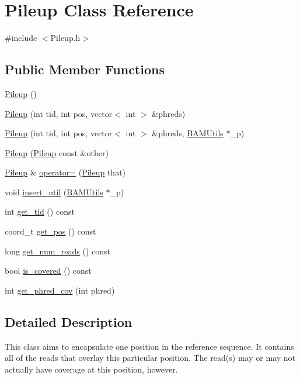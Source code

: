 \hypertarget{class_pileup}{
\section{Pileup Class Reference}
\label{class_pileup}
}


{\ttfamily \#include $<$Pileup.h$>$}

\subsection*{Public Member Functions}
\begin{DoxyCompactItemize}
\item 
\hyperlink{class_pileup_ab24ad8d1adc85141d279fa82645f9d67}{Pileup} ()
\item 
\hyperlink{class_pileup_af7a208f2f224582260aa4780f05156be}{Pileup} (int tid, int pos, vector$<$ int $>$ \&phreds)
\item 
\hyperlink{class_pileup_aa12195e46d05c2ef4bcd5c455af2fa27}{Pileup} (int tid, int pos, vector$<$ int $>$ \&phreds, \hyperlink{class_b_a_m_utils}{BAMUtils} $\ast$\_\-p)
\item 
\hyperlink{class_pileup_a0ed467fc2ce855eee7a61b83059d8877}{Pileup} (\hyperlink{class_pileup}{Pileup} const \&other)
\item 
\hyperlink{class_pileup}{Pileup} \& \hyperlink{class_pileup_a4c65041c58658064b3de1ef715990fb1}{operator=} (\hyperlink{class_pileup}{Pileup} that)
\item 
void \hyperlink{class_pileup_a5ef3f3c48d209a9297fa5d3edcc64918}{insert\_\-util} (\hyperlink{class_b_a_m_utils}{BAMUtils} $\ast$\_\-p)
\item 
int \hyperlink{class_pileup_a54cb72913b0fde34d9a781f3f9a9a2d9}{get\_\-tid} () const 
\item 
coord\_\-t \hyperlink{class_pileup_a7c2e7c25ed33a0e62e8de528218b6107}{get\_\-pos} () const 
\item 
long \hyperlink{class_pileup_a5fd72bbb7048f642b86bb668ae011124}{get\_\-num\_\-reads} () const 
\item 
bool \hyperlink{class_pileup_ab83a8e4e308f82d44034ee8fbdea4859}{is\_\-covered} () const 
\item 
int \hyperlink{class_pileup_a30556727363178d131bfe8648a18c77c}{get\_\-phred\_\-cov} (int phred)
\end{DoxyCompactItemize}


\subsection{Detailed Description}
This class aims to encapsulate one position in the reference sequence. It contains all of the reads that overlay this particular position. The read(s) may or may not actually have coverage at this position, however.

